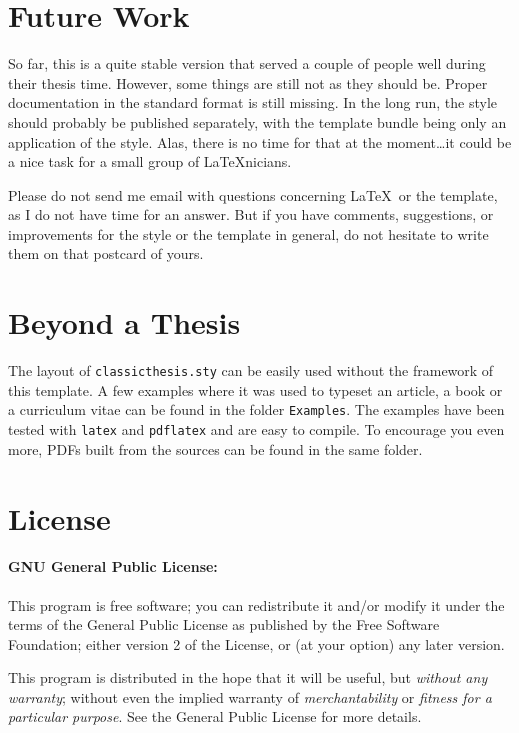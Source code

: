 \section{Future Work}
So far, this is a quite stable version that served a couple of people
well during their thesis time. However, some things are still not as
they should be. Proper documentation in the standard format is still
missing. In the long run, the style should probably be published
separately, with the template bundle being only an application of the
style. Alas, there is no time for that at the moment\dots it could be
a nice task for a small group of \LaTeX nicians.

Please do not send me email with questions concerning \LaTeX\ or the
template, as I do not have time for an answer. But if you have
comments, suggestions, or improvements for the style or the template
in general, do not hesitate to write them on that postcard of yours.


\section{Beyond a Thesis}
The layout of \texttt{classicthesis.sty} can be easily used without the
framework of this template. A few examples where it was used to typeset
an article, a book or a curriculum vitae can be found in the folder
\texttt{Examples}. The examples have been tested with
\texttt{latex} and \texttt{pdflatex} and are easy to compile. To
encourage you even more, PDFs built from the sources can be found in the
same folder.


\section{License}
\paragraph{GNU General Public License:} This program is free software;
you can redistribute it and/or modify
it under the terms of the  General Public License as
published by
the Free Software Foundation; either version 2 of the License, or
(at your option) any later version.

This program is distributed in the hope that it will be useful,
but \emph{without any warranty}; without even the implied warranty of
\emph{merchant\-ability} or \emph{fitness for a particular purpose}.
See the
 General Public License for more details.

